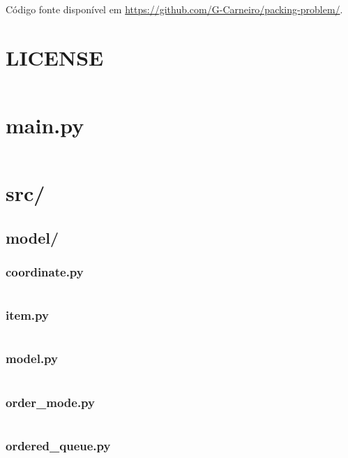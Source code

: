 Código fonte disponível em \url{https://github.com/G-Carneiro/packing-problem/}.


\section{LICENSE}\label{sec:license}
\inputminted{text}{LICENSE}


\section{main.py}\label{sec:main.py}
\inputminted{py}{main.py}


\section{src/}\label{sec:src/}

\subsection{model/}\label{subsec:model/}

\subsubsection{coordinate.py}\label{subsubsec:coordinate.py}
\inputminted{py}{src/model/coordinate.py}

\subsubsection{item.py}\label{subsubsec:item.py}
\inputminted{py}{src/model/item.py}

\subsubsection{model.py}\label{subsubsec:model.py}
\inputminted{py}{src/model/model.py}

\subsubsection{order\_mode.py}\label{subsubsec:order_mode.py}
\inputminted{py}{src/model/order_mode.py}

\subsubsection{ordered\_queue.py}\label{subsubsec:ordered_queue.py}
\inputminted{py}{src/model/ordered_queue.py}

